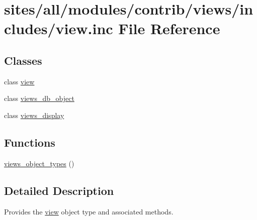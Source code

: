 \hypertarget{view_8inc}{
\section{sites/all/modules/contrib/views/includes/view.inc File Reference}
\label{view_8inc}
}
\subsection*{Classes}
\begin{CompactItemize}
\item 
class \hyperlink{classview}{view}
\item 
class \hyperlink{classviews__db__object}{views\_\-db\_\-object}
\item 
class \hyperlink{classviews__display}{views\_\-display}
\end{CompactItemize}
\subsection*{Functions}
\begin{CompactItemize}
\item 
\hyperlink{group__views__objects_gd8249e4064daa263cdadc049caff2c95}{views\_\-object\_\-types} ()
\end{CompactItemize}


\subsection{Detailed Description}
Provides the \hyperlink{classview}{view} object type and associated methods. 